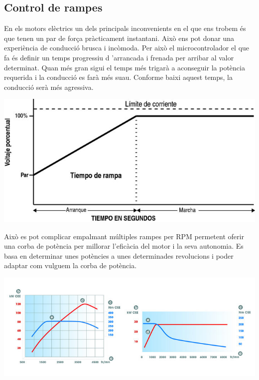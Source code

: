\subsection{Control de rampes}
En els motors elèctrics un dels principals inconvenients en el que ens trobem és que tenen un par de força pràcticament instantani. Això ens pot donar una experiència de conducció brusca i incòmoda. Per això el microcontrolador el que fa és definir un temps progressiu d 'arrancada i frenada per arribar al valor determinat. Quan més gran sigui el temps més trigarà a aconseguir la potència requerida i la conducció es farà més suau. Conforme baixi aquest temps, la conducció serà més agressiva. 

\includegraphics[width=\textwidth]{rampa}

Això es pot complicar empalmant múltiples rampes per RPM permetent oferir una corba de potència per millorar l'eficàcia del motor i la seva autonomia. Es basa en determinar unes potències a unes determinades revolucions i poder adaptar com vulguem la corba de potència.

\includegraphics[width=\textwidth]{Motors/curves}

